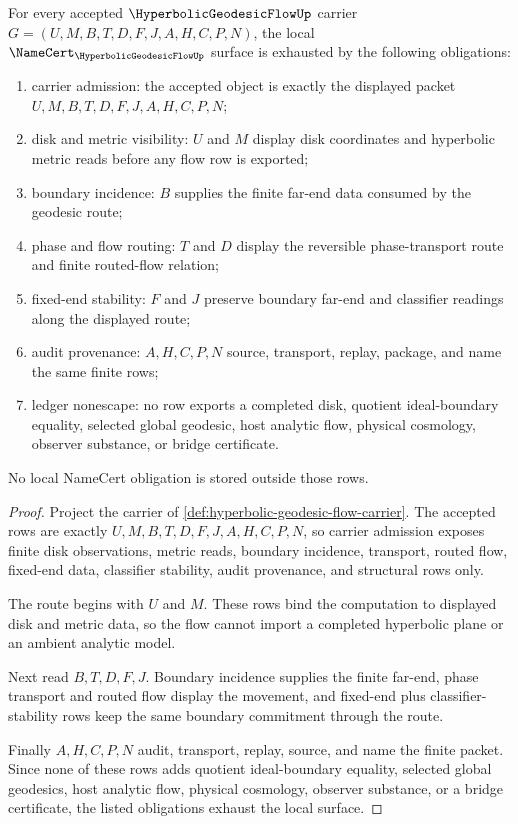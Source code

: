 \begin{theorem}
\label{thm:hyperbolic-geodesic-flow-namecert-obligations}
For every accepted $\HyperbolicGeodesicFlowUp$ carrier $G=(U,M,B,T,D,F,J,A,H,C,P,N)$, the local $\NameCert_{\HyperbolicGeodesicFlowUp}$ surface is exhausted by the following obligations:
\begin{enumerate}
\item carrier admission: the accepted object is exactly the displayed packet $U,M,B,T,D,F,J,A,H,C,P,N$;
\item disk and metric visibility: $U$ and $M$ display disk coordinates and hyperbolic metric reads before any flow row is exported;
\item boundary incidence: $B$ supplies the finite far-end data consumed by the geodesic route;
\item phase and flow routing: $T$ and $D$ display the reversible phase-transport route and finite routed-flow relation;
\item fixed-end stability: $F$ and $J$ preserve boundary far-end and classifier readings along the displayed route;
\item audit provenance: $A,H,C,P,N$ source, transport, replay, package, and name the same finite rows;
\item ledger nonescape: no row exports a completed disk, quotient ideal-boundary equality, selected global geodesic, host analytic flow, physical cosmology, observer substance, or bridge certificate.
\end{enumerate}
No local NameCert obligation is stored outside those rows.
\end{theorem}
\begin{proof}
Project the carrier of \autoref{def:hyperbolic-geodesic-flow-carrier}. The accepted rows are exactly $U,M,B,T,D,F,J,A,H,C,P,N$, so carrier admission exposes finite disk observations, metric reads, boundary incidence, transport, routed flow, fixed-end data, classifier stability, audit provenance, and structural rows only.

The route begins with $U$ and $M$. These rows bind the computation to displayed disk and metric data, so the flow cannot import a completed hyperbolic plane or an ambient analytic model.

Next read $B,T,D,F,J$. Boundary incidence supplies the finite far-end, phase transport and routed flow display the movement, and fixed-end plus classifier-stability rows keep the same boundary commitment through the route.

Finally $A,H,C,P,N$ audit, transport, replay, source, and name the finite packet. Since none of these rows adds quotient ideal-boundary equality, selected global geodesics, host analytic flow, physical cosmology, observer substance, or a bridge certificate, the listed obligations exhaust the local surface.
\end{proof}

